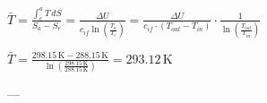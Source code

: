 \( \bar{T} = \frac{\int_{e}^{a} T \, dS}{S_a - S_e} = \frac{\Delta U}{c_{if} \ln\left(\frac{T_a}{T_e}\right)} = \frac{\Delta U}{c_{if} \cdot (T_{out} - T_{in})} \cdot \frac{1}{\ln\left(\frac{T_{out}}{T_{in}}\right)} \)  

\( \bar{T} = \frac{298.15 \, \text{K} - 288.15 \, \text{K}}{\ln\left(\frac{298.15 \, \text{K}}{288.15 \, \text{K}}\right)} = 293.12 \, \text{K} \)  

---